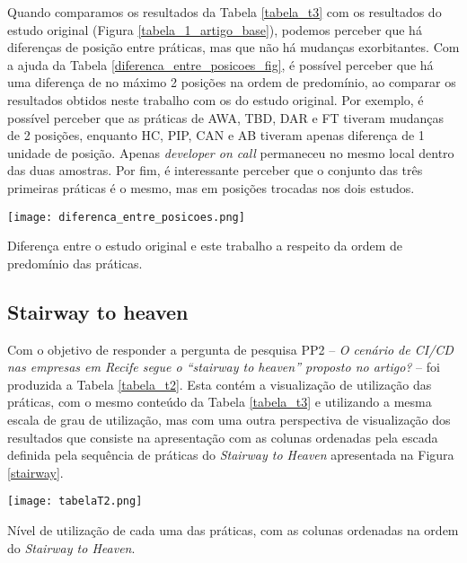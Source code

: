 Quando comparamos os resultados da Tabela \ref{tabela_t3} com os resultados do estudo original (Figura \ref{tabela_1_artigo_base}), podemos perceber que há diferenças de posição entre práticas, mas que não há mudanças exorbitantes. Com a ajuda da Tabela \ref{diferenca_entre_posicoes_fig}, é possível perceber que há uma diferença de no máximo 2 posições na ordem de predomínio, ao comparar os resultados obtidos neste trabalho com os do estudo original. Por exemplo, é possível perceber que as práticas de AWA, TBD, DAR e FT tiveram mudanças de 2 posições, enquanto HC, PIP, CAN e AB tiveram apenas diferença de 1 unidade de posição. Apenas \emph{developer on call} permaneceu no mesmo local dentro das duas amostras. Por fim, é interessante perceber que o conjunto das três primeiras práticas é o mesmo, mas em posições trocadas nos dois estudos.

\begin{table}[ht]
\begin{center}
\texttt{[image: diferenca\_entre\_posicoes.png]}
\end{center}
\caption[Diferença entre a ordem de predomínio das práticas]{
    Diferença entre o estudo original e este trabalho a respeito da ordem de predomínio das práticas.
}\label{diferenca_entre_posicoes_fig}
\end{table}

\subsection{Stairway to heaven}

Com o objetivo de responder a pergunta de pesquisa PP2 -- \emph{O cenário de CI/CD nas empresas em Recife segue o ``stairway to heaven'' proposto no artigo?} -- foi produzida a Tabela \ref{tabela_t2}. Esta contém a visualização de utilização das práticas, com o mesmo conteúdo da Tabela \ref{tabela_t3} e utilizando a mesma escala de grau de utilização, mas com uma outra perspectiva de visualização dos resultados que consiste na apresentação com as colunas ordenadas pela escada definida pela sequência de práticas do \emph{Stairway to Heaven} apresentada na Figura \ref{stairway}.

\begin{table}[ht]
\begin{center}
\texttt{[image: tabelaT2.png]}
\end{center}
\caption[Nível de utilização das práticas, com as colunas na ordem do \emph{Stairway to Heaven}]{
    Nível de utilização de cada uma das práticas, com as colunas ordenadas na ordem do \emph{Stairway to Heaven}.
}\label{tabela_t2}
\end{table}

